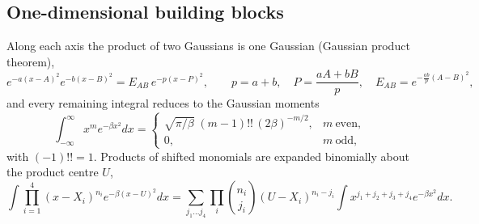 \documentclass[journal=jctcce,manuscript=suppinfo]{achemso}
\begin{document}
\subsection{One-dimensional building blocks}
Along each axis the product of two Gaussians is one Gaussian (Gaussian
product theorem),
\begin{equation}
e^{-a(x-A)^2}e^{-b(x-B)^2}=E_{AB}\,e^{-p(x-P)^2},\qquad
p=a+b,\quad P=\frac{aA+bB}{p},\quad E_{AB}=e^{-\frac{ab}{p}(A-B)^2},
\label{eq:ani-gpt}
\end{equation}
and every remaining integral reduces to the Gaussian moments
\begin{equation}
\int_{-\infty}^{\infty}x^m e^{-\beta x^2}dx=
\begin{cases}\sqrt{\pi/\beta}\;(m-1)!!\,(2\beta)^{-m/2}, & m\ \text{even},\\
0, & m\ \text{odd},\end{cases}
\label{eq:ani-moment}
\end{equation}
with $(-1)!!=1$.  Products of shifted monomials are expanded binomially
about the product centre $U$,
\begin{equation}
\int\prod_{i=1}^{4}(x-X_i)^{n_i}e^{-\beta(x-U)^2}dx
=\sum_{j_1\ldots j_4}\prod_{i}\binom{n_i}{j_i}(U-X_i)^{n_i-j_i}
\int x^{j_1+j_2+j_3+j_4}e^{-\beta x^2}dx .
\label{eq:ani-int2}
\end{equation}
\end{document}
